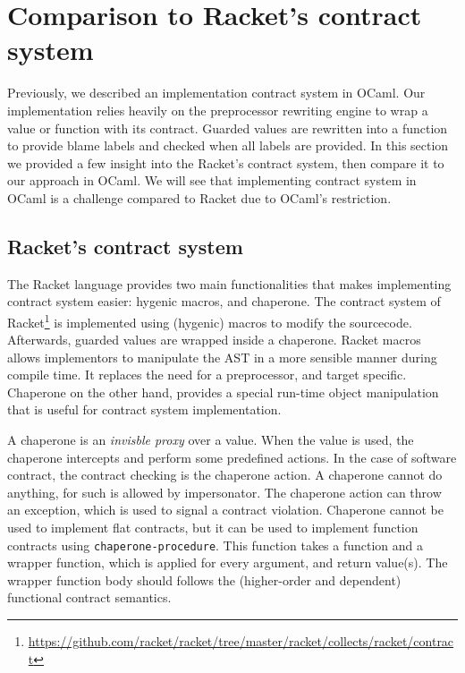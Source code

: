 \chapter{Comparison to Racket's contract system}
\label{chap:compare}

Previously, we described an implementation contract system in OCaml. Our implementation relies heavily on the preprocessor rewriting engine to wrap a value or function with its contract. Guarded values are rewritten into a function to provide blame labels and checked when all labels are provided. In this section we provided a few insight into the Racket's contract system, then compare it to our approach in OCaml. We will see that implementing contract system in OCaml is a challenge compared to Racket due to OCaml's restriction.

\section{Racket's contract system}

The Racket language provides two main functionalities that makes implementing contract system easier: hygenic macros, and chaperone. The contract system of Racket\footnote{\href{https://github.com/racket/racket/tree/master/racket/collects/racket/contract}{https://github.com/racket/racket/tree/master/racket/collects/racket/contract}} is implemented using (hygenic) macros to modify the sourcecode. Afterwards, guarded values are wrapped inside a chaperone. Racket macros allows implementors to manipulate the AST in a more sensible manner during compile time. It replaces the need for a preprocessor, and target specific. Chaperone on the other hand, provides a special run-time object manipulation that is useful for contract system implementation.

A chaperone is an \textit{invisble proxy} over a value. When the value is used, the chaperone intercepts and perform some predefined actions. In the case of software contract, the contract checking is the chaperone action. A chaperone cannot do anything, for such is allowed by impersonator. The chaperone action can throw an exception, which is used to signal a contract violation. Chaperone cannot be used to implement flat contracts, but it can be used to implement function contracts using \texttt{chaperone-procedure}. This function takes a function and a wrapper function, which is applied for every argument, and return value(s). The wrapper function body should follows the (higher-order and dependent) functional contract semantics.

